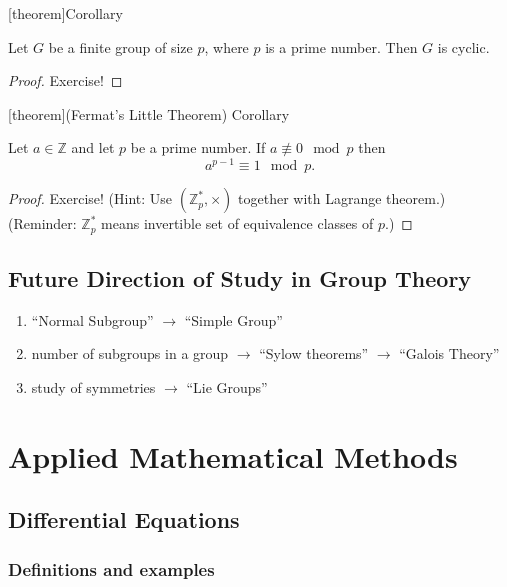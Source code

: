 \documentclass[12pt]{report}
\theoremstyle{definition}
\begin{document}
[theorem]{Corollary}
\begin{cyclic G}
    Let $G$ be a finite group of size $p$, where $p$ is a prime number.
    Then $G$ is cyclic.
\end{cyclic G}

\begin{proof}
    Exercise!
\end{proof}

[theorem]{(Fermat's Little Theorem) Corollary}
\begin{Fermat's Little Theorem}
    Let $a \in \mathbb{Z}$ and let $p$ be a prime number.
    If $a \not\equiv 0 \mod p$ then\[
        a^{p - 1} \equiv 1 \mod p.
    \]
\end{Fermat's Little Theorem}

\begin{proof}
    Exercise! (Hint: Use $(\mathbb{Z}_p^{*}, \times)$ together with Lagrange theorem.)
    (Reminder: $\mathbb{Z}^{*}_p$ means invertible set of equivalence classes of $p$.)
\end{proof}

\section{Future Direction of Study in Group Theory}

\begin{enumerate}
    \item ``Normal Subgroup'' $\rightarrow$ ``Simple Group''
    \item number of subgroups in a group $\rightarrow$ ``Sylow theorems''
        $\rightarrow$ ``Galois Theory''
    \item study of symmetries $\rightarrow$ ``Lie Groups''
\end{enumerate}



\chapter{Applied Mathematical Methods}

\section{Differential Equations}

\subsection{Definitions and examples}
\end{document}
